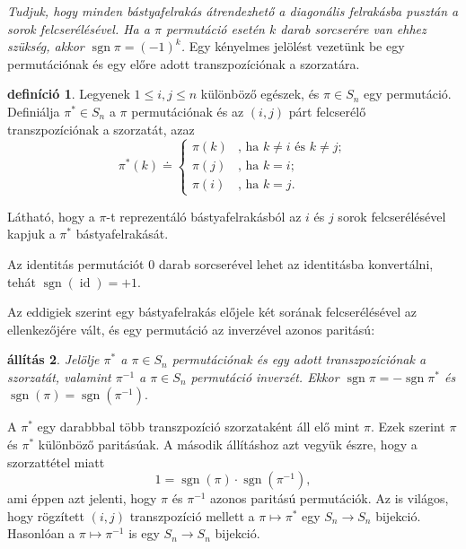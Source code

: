 \documentclass[a4paper, showtrims]{memoir}
\makeatletter
\renewenvironment{proof}[1][\proofname]
    {\par\pushQED{\qed}%
    \normalfont \topsep6\p@\@plus6\p@\relax
    \trivlist
    \item[\hskip\labelsep
        \itshape
    #1\@addpunct{:}]\ignorespaces}
    {\popQED\endtrivlist\@endpefalse}
\theoremstyle{plain}
\newtheorem{proposition}{állítás}[chapter]
\theoremstyle{remark}
\theoremstyle{definition}
\newtheorem{definition}[proposition]{definíció}
\DeclareMathOperator{\sgn}{sgn}
\DeclareMathOperator{\id}{id}
\makeatother
\begin{document}
    \emph{%
    	Tudjuk, hogy minden bástyafelrakás átrendezhető a diagonális felrakásba pusztán a sorok felcserélésével.
    	Ha a $\pi$ permutáció esetén $k$ darab sorcserére van ehhez szükség,
    	akkor $\sgn \pi=\left( -1 \right)^k$.
    }
Egy kényelmes jelölést vezetünk be egy permutációnak és egy előre adott transzpozíciónak a szorzatára.
\begin{definition}
	Legyenek $1\leq i,j\leq n$ különböző egészek,
	és $\pi \in S_{n}$ egy permutáció.
	Definiálja $\pi ^{\ast }\in S_{n}$ a $\pi$ permutációnak és az $\left( i,j \right)$ párt felcserélő transzpozíciónak a szorzatát,
	azaz
	\[
		\pi ^{\ast }\left( k\right) \doteq \left\{
		\begin{array}{ll}
			\pi \left( k\right) &
			\text{, ha }k\neq i\text{ és }k\neq j; \\
			\pi \left( j\right) & \text{, ha }k=i; \\
			\pi \left( i\right) & \text{, ha }k=j.
		\end{array}
		\right.
	\]
\end{definition}
Látható,
hogy a $\pi$-t reprezentáló bástyafelrakásból az $i$ és $j$ sorok felcserélésével kapjuk a $\pi^{\ast}$ bástyafelrakását.

Az identitás permutációt $0$ darab sorcserével lehet az identitásba konvertálni,
tehát $\sgn(\id)=+1$.

Az eddigiek szerint egy bástyafelrakás előjele két sorának felcserélésével az ellenkezőjére vált, és 
egy permutáció az inverzével azonos paritású:
\begin{proposition}
        Jelölje $\pi^\ast$ a $\pi\in S_n$ permutációnak és egy adott transzpozíciónak a szorzatát,
        valamint $\pi^{-1}$ a $\pi\in S_n$ permutáció inverzét.
        	Ekkor
            \(\sgn \pi=-\sgn\pi^\ast
        	\)
            és
            \(
            	\sgn\left( \pi \right)=\sgn\left( \pi^{-1} \right).
            \)
\end{proposition}
\begin{proof}
    A $\pi^{\ast}$ egy darabbbal több transzpozíció szorzataként áll elő mint $\pi$.
    Ezek szerint $\pi$ és $\pi^\ast$ különböző paritásúak.
    A második állításhoz azt vegyük észre, hogy a szorzattétel miatt
    \[
        1=\sgn\left( \pi \right)\cdot\sgn\left( \pi^{-1} \right),
    \]
    ami éppen azt jelenti, hogy $\pi$ és $\pi^{-1}$ azonos paritású permutációk.
\end{proof}
Az is világos, 
hogy rögzített $\left( i,j \right)$ transzpozíció mellett 
a $\pi\mapsto\pi^\ast$ egy $S_n\to S_n$ bijekció.
Hasonlóan 
a $\pi\mapsto\pi^{-1}$ is egy $S_n\to S_n$ bijekció.
\end{document}
